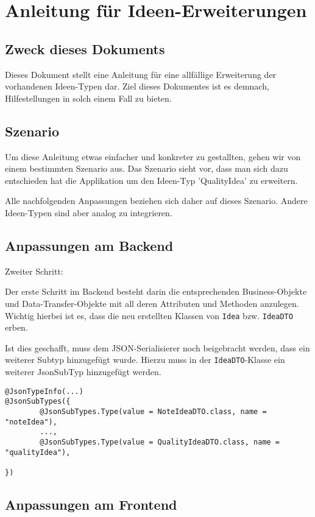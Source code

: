\section{Anleitung für Ideen-Erweiterungen}
\label{sec:Ideen_Erweiterung}

\subsection{Zweck dieses Dokuments}
Dieses Dokument stellt eine Anleitung für eine allfällige Erweiterung der vorhandenen Ideen-Typen dar. Ziel dieses Dokumentes ist es demnach, Hilfestellungen in solch einem Fall zu bieten. 

\subsection{Szenario}
Um diese Anleitung etwas einfacher und konkreter zu gestallten, gehen wir von einem bestimmten Szenario aus. Das Szenario sieht vor, dass man sich dazu entschieden hat die Applikation um den Ideen-Typ 'QualityIdea' zu erweitern.

Alle nachfolgenden Anpassungen beziehen sich daher auf dieses Szenario. Andere Ideen-Typen sind aber analog zu integrieren.

\subsection{Anpassungen am Backend}
\begin{labeling}{Zweiter Schritt:}
	\item [Erster Schritt:] Der erste Schritt im Backend besteht darin die entsprechenden Business-Objekte und Data-Transfer-Objekte mit all deren Attributen und Methoden anzulegen. Wichtig hierbei ist es, dass die neu erstellten Klassen von \texttt{Idea} bzw. \texttt{IdeaDTO} erben.
	\item [Zweiter Schritt:] Ist dies geschafft, muss dem JSON-Serialisierer noch beigebracht werden, dass ein weiterer Subtyp hinzugefügt wurde. Hierzu muss in der \texttt{IdeaDTO}-Klasse ein weiterer JsonSubTyp hinzugefügt werden.
	
\begin{lstlisting}[caption={weiterer Ideen-Typ hinzufügen}, label=addIdeaType]
@JsonTypeInfo(...)
@JsonSubTypes({
        @JsonSubTypes.Type(value = NoteIdeaDTO.class, name = "noteIdea"),
        ...,
        @JsonSubTypes.Type(value = QualityIdeaDTO.class, name = "qualityIdea"),
        
})
\end{lstlisting}

	\item [Dritter Schritt:]
	
\end{labeling}





 


\subsection{Anpassungen am Frontend}